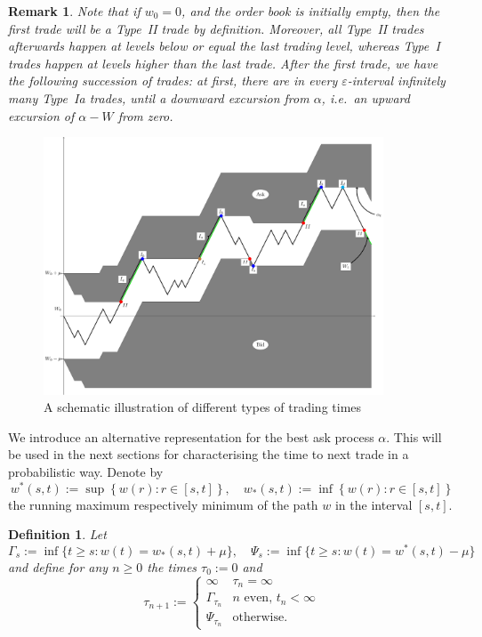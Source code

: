 \documentclass[11pt]{scrartcl}
\newtheorem{definition}[theorem]{Definition}
\newtheorem{remark}[theorem]{Remark}
\begin{document}
\begin{remark}
Note that if $w_{0}=0$, and the order book is initially empty, then the
first trade will be a Type~{II} trade by definition. Moreover, all Type~{II}
trades afterwards happen at levels below or equal the last trading level,
whereas Type~{I} trades happen at levels higher than the last trade. After
the first trade, we have the following succession of trades: at first, there
are in every $\varepsilon $-interval infinitely many Type~{Ia} trades, until
a downward excursion from $\alpha $, i.e.\ an upward excursion of $\alpha -W$
from zero.
\end{remark}

\begin{figure}[H]
\includegraphics[width=0.9\textwidth]{paul7new.pdf}%
\caption{A schematic illustration of different types of trading times}
\label{Fig:Paul}
\end{figure}

We introduce an alternative representation for the best ask process $\alpha$. 
This will be used in the next sections for characterising the time to next
trade in a probabilistic way. Denote by 
\begin{equation}
w^{\ast}(s,t):=\sup\left\{ w(r):r\in\left[ s,t\right] \right\}, \quad
w_{\ast}(s,t):=\inf\left\{ w(r):r\in\left[ s,t\right] \right\}
\end{equation}
the running maximum respectively minimum of the path $w$ in the interval $%
[s,t]$.

\begin{definition}
\label{type II trades} Let 
\begin{equation}
\Gamma_s:=\inf\{t\geq s:w(t)=w_{\ast}(s,t)+\mu\},\quad \Psi_{s}
:=\inf\{t\geq s:w(t)=w^{\ast}(s,t)-\mu\}
\end{equation}
and define for any $n\geq0$ the times $\tau_{0}:=0$ and 
\begin{equation}
\tau_{n+1}:=%
\begin{cases}
\infty & \tau_{n}=\infty \\ 
\Gamma_{\tau_{n}} & n\text{ even, }t_{n}<\infty \\ 
\Psi_{\tau_{n}} & \text{otherwise.}%
\end{cases}%
\end{equation}
\end{definition}
\end{document}
